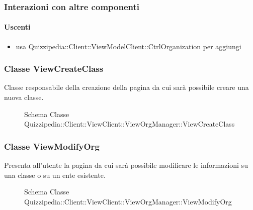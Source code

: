 \subsubsection{Interazioni con altre componenti}
\paragraph{Uscenti}
\begin{itemize}
\item usa Quizzipedia::Client::ViewModelClient::CtrlOrganization per aggiungi
\end{itemize}
\subsubsection{Classe ViewCreateClass}
Classe responsabile della creazione della pagina da cui sarà possibile creare una nuova classe.
\begin{figure}[H]
\centering
\noindent{}
\caption[Schema Classe ViewCreateClass]{Schema Classe Quizzipedia::Client::ViewClient::ViewOrgManager::ViewCreateClass}
\end{figure}
\subsubsection{Classe ViewModifyOrg}
Presenta all'utente la pagina da cui sarà possibile modificare le informazioni su una classe o su un ente esistente.
\begin{figure}[H]
\centering
\noindent{}
\caption[Schema Classe ViewModifyOrg]{Schema Classe Quizzipedia::Client::ViewClient::ViewOrgManager::ViewModifyOrg}
\end{figure}
